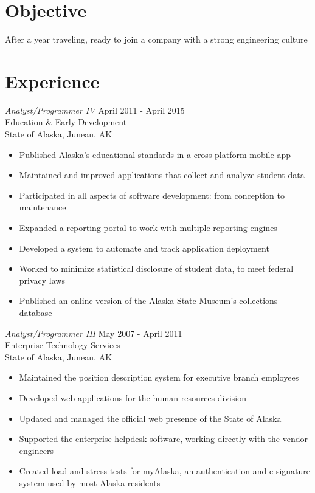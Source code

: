 \documentclass[line,margin]{res}
\begin{document}
\address{\href{mailto:amiller@alumni.uidaho.edu}{amiller@alumni.uidaho.edu}\\ (253) 336-6451}
\address{PO Box 7130\\ New York, NY 10116}
 
\begin{resume}
 
\section{Objective}       After a year traveling, ready to join a company with a strong engineering culture
\section{Experience} {\sl Analyst/Programmer IV} \hfill April 2011 - April 2015 \\
		Education \& Early Development \\
                State of Alaska, Juneau, AK
                \begin{itemize}  \itemsep -2pt %
        \item Published Alaska's educational standards in a cross-platform mobile app
        \item Maintained and improved applications that collect and analyze student data
		\item Participated in all aspects of software development: from conception to maintenance
		\item Expanded a reporting portal to work with multiple reporting engines
		\item Developed a system to automate and track application deployment 
		\item Worked to minimize statistical disclosure of student data, to meet federal privacy laws
		\item Published an online version of the Alaska State Museum's collections database
                \end{itemize}

		{\sl Analyst/Programmer III} \hfill May 2007 - April 2011 \\
                Enterprise Technology Services \\
                State of Alaska, Juneau, AK
                \begin{itemize}  \itemsep -2pt %
        \item Maintained the position description system for executive branch employees
        \item Developed web applications for the human resources division
		\item Updated and managed the official web presence of the State of Alaska
		\item Supported the enterprise helpdesk software, working directly with the vendor engineers
		\item Created load and stress tests for myAlaska, an authentication and e-signature system used by most Alaska residents
                \end{itemize}
 

\end{resume}
\end{document}
